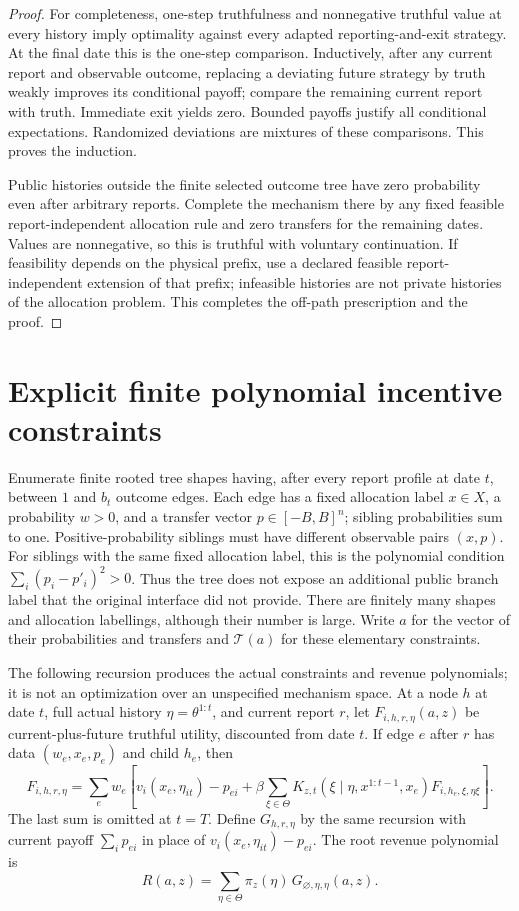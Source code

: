 \documentclass[11pt,a4paper]{article}
\begin{document}
\begin{proof}
For completeness, one-step truthfulness and nonnegative truthful value
at every history imply optimality against every adapted reporting-and-exit
strategy. At the final date this is the one-step comparison. Inductively,
after any current report and observable outcome, replacing a deviating
future strategy by truth weakly improves its conditional payoff; compare
the remaining current report with truth. Immediate exit yields zero.
Bounded payoffs justify all conditional expectations. Randomized
deviations are mixtures of these comparisons. This proves the induction.

Public histories outside the finite selected outcome tree have zero
probability even after arbitrary reports. Complete the mechanism there
by any fixed feasible report-independent allocation rule and zero
transfers for the remaining dates. Values are nonnegative, so this is
truthful with voluntary continuation. If feasibility depends on the
physical prefix, use a declared feasible report-independent extension
of that prefix; infeasible histories are not private histories of the
allocation problem. This completes the off-path prescription and the
proof.
\end{proof}

\section{Explicit finite polynomial incentive constraints}
\label{sec:polynomial}

Enumerate finite rooted tree shapes having, after every report profile
at date $t$, between $1$ and $b_t$ outcome edges. Each edge has a fixed
allocation label $x\in X$, a probability $w>0$, and a transfer vector
$p\in[-B,B]^n$; sibling probabilities sum to one. Positive-probability
siblings must have different observable pairs $(x,p)$. For siblings
with the same fixed allocation label, this is the polynomial condition
$\sum_i(p_i-p'_i)^2>0$. Thus the tree does not expose an additional
public branch label that the original interface did not provide.
There are finitely many shapes and allocation labellings, although
their number is large. Write $a$ for the vector of their probabilities
and transfers and $\mathcal T(a)$ for these elementary constraints.

The following recursion produces the actual constraints and revenue
polynomials; it is not an optimization over an unspecified mechanism
space. At a node $h$ at date $t$, full actual history
$\eta=\theta^{1:t}$, and current report $r$, let
$F_{i,h,r,\eta}(a,z)$ be current-plus-future truthful utility, discounted
from date $t$. If edge $e$ after $r$ has data $(w_e,x_e,p_e)$ and child
$h_e$, then
\[
 F_{i,h,r,\eta}=
 \sum_e w_e\left[
 v_i(x_e,\eta_{it})-p_{ei}
 +\beta\sum_{\xi\in\Theta}
 K_{z,t}(\xi\mid\eta,x^{1:t-1},x_e)
 F_{i,h_e,\xi,\eta\xi}
 \right].
 \tag{F3}
\]
The last sum is omitted at $t=T$. Define $G_{h,r,\eta}$ by the same
recursion with current payoff $\sum_i p_{ei}$ in place of
$v_i(x_e,\eta_{it})-p_{ei}$. The root revenue polynomial is
\[
 R(a,z)=\sum_{\eta\in\Theta}\pi_z(\eta)\,
 G_{\varnothing,\eta,\eta}(a,z).
 \tag{F4}
\]
\end{document}
